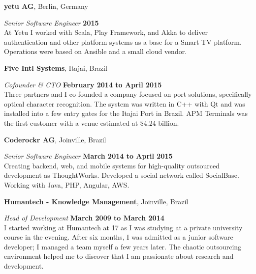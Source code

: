 \documentclass[12pt]{article}
\newcommand{\halfblankline}{\quad\vspace{-0.5\baselineskip}\pagebreak[3]}
\begin{document}
\textbf{yetu AG},
Berlin, Germany
\begin{outerlist}

    \item[] \textit{Senior Software Engineer}%
            \hfill \textbf{2015}\\
            At Yetu I worked with Scala, Play Framework, and Akka to deliver authentication and other platform systems as a base for a Smart TV platform. Operations were based on Ansible and a small cloud vendor.

\end{outerlist}

\halfblankline

\textbf{Five Intl Systems},
Itajai, Brazil
\begin{outerlist}

    \item[] \textit{Cofounder \& CTO}%
            \hfill \textbf{February 2014 to April 2015}\\
            Three partners and I co-founded a company focused on port solutions, specifically optical character recognition. The system was written in C++ with Qt and was installed into a few entry gates for the Itajai Port in Brazil. APM Terminals was the first customer with a venue estimated at \$4.24 billion.
            
\end{outerlist}

\halfblankline

\textbf{Coderockr AG},
Joinville, Brazil
\begin{outerlist}

    \item[] \textit{Senior Software Engineer}%
            \hfill \textbf{March 2014 to April 2015}\\
            Creating backend, web, and mobile systems for high-quality outsourced development as ThoughtWorks. Developed a social network called SocialBase. Working with Java, PHP, Angular, AWS.
            
\end{outerlist}

\halfblankline

\textbf{Humantech - Knowledge Management},
Joinville, Brazil
\begin{outerlist}

    \item[] \textit{Head of Development}%
            \hfill \textbf{March 2009 to March 2014}\\
            I started working at Humantech at 17 as I was studying at a private university course in the evening. After six months, I was admitted as a junior software developer; I managed a team myself a few years later. The chaotic outsourcing environment helped me to discover that I am passionate about research and development.

\end{outerlist}
\end{document}
